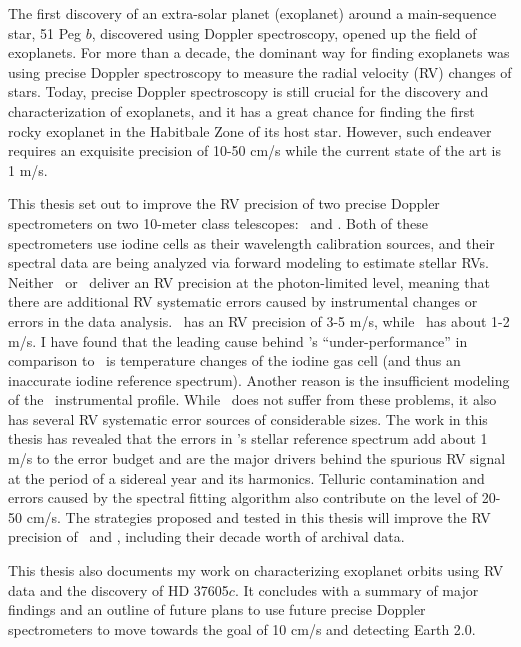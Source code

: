 The first discovery of an extra-solar planet (exoplanet) around a
main-sequence star, 51 Peg $b$, discovered using Doppler spectroscopy,
opened up the field of exoplanets. For more than a decade, the
dominant way for finding exoplanets was using precise Doppler
spectroscopy to measure the radial velocity (RV) changes of
stars. Today, precise Doppler spectroscopy is still crucial for the
discovery and characterization of exoplanets, and it has a great
chance for finding the first rocky exoplanet in the Habitbale Zone of
its host star. However, such endeaver requires an exquisite precision
of 10-50 cm/s while the current state of the art is 1 m/s.

This thesis set out to improve the RV precision of two precise Doppler
spectrometers on two 10-meter class telescopes: \het\ and \keck. Both
of these spectrometers use iodine cells as their wavelength
calibration sources, and their spectral data are being analyzed via
forward modeling to estimate stellar RVs. Neither \het\ or \keck\
deliver an RV precision at the photon-limited level, meaning that
there are additional RV systematic errors caused by instrumental
changes or errors in the data analysis. \het\ has an RV precision of
3-5 m/s, while \keck\ has about 1-2 m/s. I have found that the leading
cause behind \het's ``under-performance'' in comparison to \keck\ is
temperature changes of the iodine gas cell (and thus an inaccurate
iodine reference spectrum). Another reason is the insufficient
modeling of the \het\ instrumental profile. While \keck\ does not
suffer from these problems, it also has several RV systematic error
sources of considerable sizes. The work in this thesis has revealed
that the errors in \keck's stellar reference spectrum add about 1 m/s
to the error budget and are the major drivers behind the spurious RV
signal at the period of a sidereal year and its harmonics. Telluric
contamination and errors caused by the spectral fitting algorithm also
contribute on the level of 20-50 cm/s. The strategies proposed and
tested in this thesis will improve the RV precision of \het\ and
\keck, including their decade worth of archival data.

This thesis also documents my work on characterizing exoplanet orbits
using RV data and the discovery of HD 37605$c$. It concludes with a
summary of major findings and an outline of future plans to use future
precise Doppler spectrometers to move towards the goal of 10 cm/s and
detecting Earth 2.0.


